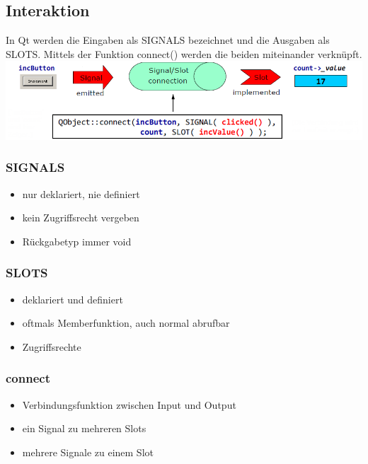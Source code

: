 \subsection{Interaktion}
In Qt werden die Eingaben als SIGNALS bezeichnet und die Ausgaben als SLOTS. Mittels der Funktion connect() werden die beiden miteinander verknüpft.\\
\includegraphics[width=15cm]{images/connect.png}

\begin{multicols}{3}
\subsubsection{SIGNALS}
\begin{itemize}
	\item nur deklariert, nie definiert
	\item kein Zugriffsrecht vergeben
	\item Rückgabetyp immer void
\end{itemize}

\subsubsection{SLOTS}
\begin{itemize}
	\item deklariert und definiert
	\item oftmals Memberfunktion, auch normal abrufbar
	\item Zugriffsrechte
\end{itemize}

\subsubsection{connect}
\begin{itemize}
	\item Verbindungsfunktion zwischen Input und Output
	\item ein Signal zu mehreren Slots
	\item mehrere Signale zu einem Slot
\end{itemize}
\end{multicols}

